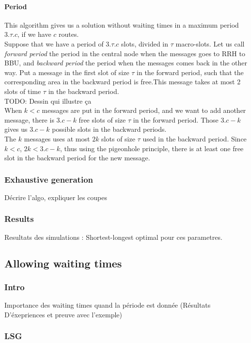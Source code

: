 \documentclass[a4paper,10pt]{article}
\newcommand{\todo}[1]{{\color{red} TODO: {#1}}}
\begin{document}
      \paragraph{Period}
	This algorithm gives us a solution without waiting times in a maximum period $3.\tau.c$, if we have $c$ routes.\\
	Suppose that we have a period of $3.\tau.c$ slots, divided in $\tau$ macro-slots. Let us call {\em forward period} the period in the central node when the messages goes to RRH to BBU, and {\em backward period} the period when the messages comes back in the other way. Put a message in the first slot of size $\tau$ in the forward period, such that the corresponding area in the backward period is free.This message takes at most 2 slots of time $\tau$ in the backward period.\\
	\todo{Dessin qui illustre ça}\\
	When $k < c$ messages are put in the forward period, and we want to add another message, there is $3.c - k$ free slots of size $\tau$ in the forward period. Those $3.c - k$ gives us $3.c - k$ possible slots in the backward periods.\\
	The $k$ messages uses at most $2k$ slots of size $\tau$ used in the backward period. Since $k<c$,  $2k < 3.c - k$, thus using the pigeonhole principle, there is at least one free slot in the backward period for the new message.
	
    \subsubsection{Exhaustive generation}
      Décrire l'algo, expliquer les coupes
    \subsubsection{Results}
      Resultats des simulations : Shortest-longest optimal pour ces parametres.
      
   \subsection{Allowing waiting times}
     \subsubsection{Intro}
	Importance des waiting times quand la période est donnée (Résultats D'éxepriences et preuve avec l'exemple)
     \subsubsection{LSG}
\end{document}
